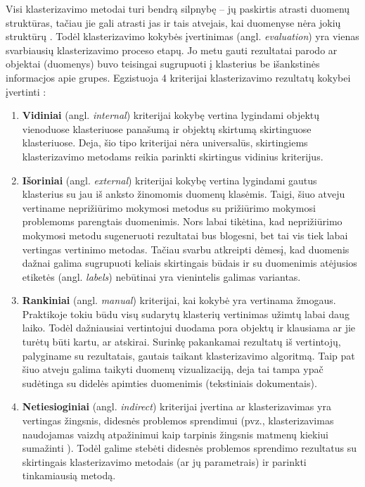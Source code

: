 \documentclass{VUMIFInfKursinis}
\newcommand{\ltang}[2]{#1 (angl. \textit{#2})}
\begin{document}
Visi klasterizavimo metodai turi bendrą silpnybę – jų paskirtis atrasti
duomenų struktūras, tačiau jie gali atrasti jas ir tais atvejais, kai
duomenyse nėra jokių struktūrų \cite{theodoridis2003feature}.
Todėl klasterizavimo kokybės \ltang{įvertinimas}{evaluation} yra
vienas svarbiausių klasterizavimo proceso etapų. Jo metu gauti
rezultatai parodo ar objektai (duomenys) buvo teisingai sugrupuoti į
klasterius be išankstinės informacjos apie grupes. Egzistuoja 4
kriterijai klasterizavimo rezultatų kokybei įvertinti \cite{feldman2007text}:

\begin{enumerate}
\item
  \ltang{\textbf{Vidiniai}}{internal} kriterijai kokybę vertina
  lygindami objektų vienoduose klasteriuose panašumą ir objektų skirtumą
  skirtinguose klasteriuose. Deja, šio tipo kriterijai nėra universalūs,
  skirtingiems klasterizavimo metodams reikia parinkti skirtingus
  vidinius kriterijus.
\item
  \ltang{\textbf{Išoriniai}}{external} kriterijai kokybę vertina
  lygindami gautus klasterius su jau iš anksto žinomomis duomenų
  klasėmis. Taigi, šiuo atveju vertiname neprižiūrimo mokymosi metodus
  su prižiūrimo mokymosi problemoms parengtais duomenimis. Nors labai
  tikėtina, kad neprižiūrimo mokymosi metodu sugeneruoti rezultatai bus
  blogesni, bet tai vis tiek labai vertingas vertinimo metodas. Tačiau
  svarbu atkreipti dėmesį, kad duomenis dažnai galima sugrupuoti keliais
  skirtingais būdais ir su duomenimis atėjusios \ltang{etiketės}{labels} 
  nebūtinai yra vienintelis galimas variantas. 
\item
  \ltang{\textbf{Rankiniai}}{manual} kriterijai, kai kokybė yra
  vertinama žmogaus. Praktikoje tokiu būdu visų sudarytų klasterių
  vertinimas užimtų labai daug laiko. Todėl dažniausiai vertintojui
  duodama pora objektų ir klausiama ar jie turėtų būti kartu, ar
  atskirai. Surinkę pakankamai rezultatų iš vertintojų, palyginame su
  rezultatais, gautais taikant klasterizavimo algoritmą. Taip pat šiuo
  atveju galima taikyti duomenų vizualizaciją, deja tai tampa ypač
  sudėtinga su didelės apimties duomenimis (tekstiniais dokumentais).
\item
  \ltang{\textbf{Netiesioginiai}}{indirect}
  kriterijai  įvertina  ar klasterizavimas yra vertingas žingsnis, didesnės
  problemos sprendimui   (pvz., klasterizavimas naudojamas vaizdų 
  atpažinimui  kaip tarpinis žingsnis matmenų kiekiui sumažinti ).
  Todėl galime  stebėti   didesnės problemos sprendimo  rezultatus
  su skirtingais klasterizavimo
  metodais  (ar jų parametrais) ir parinkti  tinkamiausią metodą.
\end{enumerate}
\end{document}
